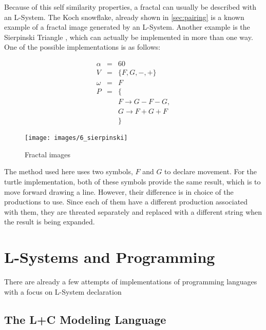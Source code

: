\documentclass{acmtog}
\begin{document}
Because of this self similarity properties, a fractal can usually be described with an L-System. The Koch snowflake, already shown in \autoref{sec:pairing} is a known example of a fractal image generated by an L-System. Another example is the Sierpinski Triangle \cite{FRACTALS}, which can actually be implemented in more than one way. One of the possible implementations is as follows:

\begin{eqnarray*}
  \alpha  &=& 60                        \\
  V       &=& \{F, G, -, +\}            \\
  \omega  &=& F                         \\
  P       &=& \{                        \\
          & & F \rightarrow G-F-G,      \\
          & & G \rightarrow F+G+F       \\
          & & \}                        
\end{eqnarray*}

\begin{figure}[!htp]
  \begin{center}
    \texttt{[image: images/6\_sierpinski]}
    \caption{Fractal images \label{fig:Sierpinski Triangle}}
    \end{center}
\end{figure}

The method used here uses two symbols, $F$ and $G$ to declare movement. For the turtle implementation, both of these symbols provide the same result, which is to move forward drawing a line. However, their difference is in choice of the productions to use. Since each of them have a different production associated with them, they are threated separately and replaced with a different string when the result is being expanded.

\section{L-Systems and Programming}
\label{sec:languages}

There are already a few attempts of implementations of programming languages with a focus on L-System declaration

\subsection{The L+C Modeling Language}
\label{subsec:lc_language}
\end{document}
